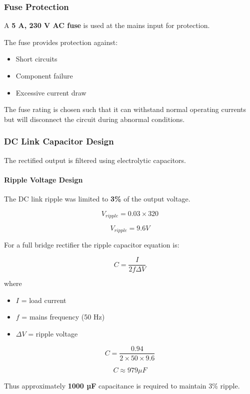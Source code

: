 \subsubsection{Fuse Protection}

A \textbf{5 A, 230 V AC fuse} is used at the mains input for protection.

The fuse provides protection against:

\begin{itemize}
\item Short circuits
\item Component failure
\item Excessive current draw
\end{itemize}

The fuse rating is chosen such that it can withstand normal operating currents but will disconnect the circuit during abnormal conditions.

\subsubsection{DC Link Capacitor Design}

The rectified output is filtered using electrolytic capacitors.


\paragraph{Ripple Voltage Design}

The DC link ripple was limited to \textbf{3\%} of the output voltage.

\[
V_{ripple} = 0.03 \times 320
\]

\[
V_{ripple} = 9.6V
\]

For a full bridge rectifier the ripple capacitor equation is:

\[
C = \frac{I}{2f\Delta V}
\]

where

\begin{itemize}
\item $I$ = load current
\item $f$ = mains frequency (50 Hz)
\item $\Delta V$ = ripple voltage
\end{itemize}

\[
C = \frac{0.94}{2 \times 50 \times 9.6}
\]

\[
C \approx 979 \mu F
\]

Thus approximately \textbf{1000 µF} capacitance is required to maintain 3\% ripple.

